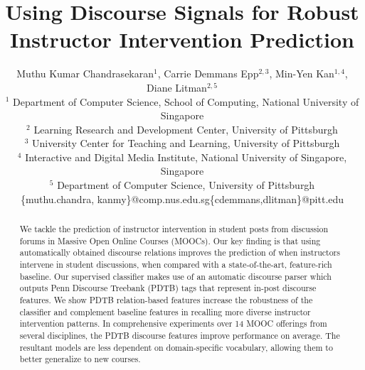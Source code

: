 \documentclass[letterpaper]{article}
\begin{document}
\title{Using Discourse Signals for Robust Instructor Intervention Prediction}
\author{Muthu Kumar Chandrasekaran$^1$, Carrie Demmans Epp$^{2,3}$, 
		 Min-Yen Kan$^{1,4}$, Diane Litman$^{2,5}$ \\ 
$^1$ Department of Computer Science, School of Computing, National University of Singapore\\
$^2$ Learning Research and Development Center, University of Pittsburgh\\
$^3$ University Center for Teaching and Learning, University of Pittsburgh\\
$^4$ Interactive and Digital Media Institute, National University of Singapore, Singapore\\
$^5$ Department of Computer Science, University of Pittsburgh\\
\{muthu.chandra, kanmy\}@comp.nus.edu.sg\hspace{1cm}\{cdemmans,dlitman\}@pitt.edu
}

\maketitle
\begin{abstract}
We tackle the prediction of instructor intervention in student posts 
from discussion forums 
in Massive Open Online Courses (MOOCs). Our key finding is 
that using automatically obtained discourse relations improves the 
prediction of when instructors intervene in student discussions, when 
compared with a state-of-the-art, feature-rich baseline. Our supervised 
classifier makes use of an automatic discourse parser which outputs Penn 
Discourse Treebank (PDTB) tags that represent in-post discourse features. 
We show PDTB relation-based features increase the robustness of the 
classifier and complement baseline 
features in recalling more diverse instructor intervention patterns. 
In comprehensive experiments over 14 MOOC offerings from  
several disciplines, the PDTB discourse features improve performance 
on average. The resultant models are less dependent on domain-specific 
vocabulary, allowing them to better generalize to new courses.
\end{abstract}
\end{document}

